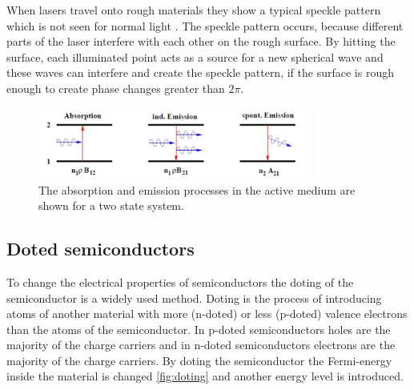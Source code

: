When lasers travel onto rough materials they show a typical speckle pattern which is not seen for normal light \cite{speckle}.
The speckle pattern occurs, because different parts of the laser interfere with each other on the rough surface.
By hitting the surface, each illuminated point acts as a source for a new spherical wave and these waves can interfere and create the speckle pattern, if the surface is rough enough to create phase changes greater than $2\pi$.

\begin{figure}[ht]
    \center
    \includegraphics[width=0.8\textwidth]{bilder/emission.jpg}
    \caption{The absorption and emission processes in the active medium are shown for a two state system. \cite{anleitungHeNe}}
    \label{fig:emission}
\end{figure}

\subsection{Doted semiconductors}
\label{sec:doting}
To change the electrical properties of semiconductors the doting of the semiconductor is a widely used method.
Doting is the process of introducing atoms of another material with more (n-doted) or less (p-doted) valence electrons than the atoms of the semiconductor.
In p-doted semiconductors holes are the majority of the charge carriers and in n-doted semiconductors electrons are the majority of the charge carriers.
By doting the semiconductor the Fermi-energy inside the material is changed \ref{fig:doting} and another energy level is introduced.

